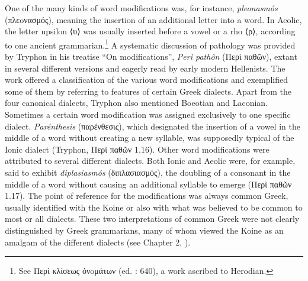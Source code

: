 One of the many kinds of word modifications was, for instance, \textit{pleonasmós} (πλεoνασμός), meaning the insertion of an additional letter into a word. In Aeolic, the letter upsilon ⟨υ⟩ was usually inserted before a vowel or a rho ⟨ρ⟩, according to one ancient grammarian.\footnote{{See Περὶ κλίσεως ὀνoμάτων (ed. \citealt{Lentz1870}: 640), a work ascribed to Herodian.}} A systematic discussion of pathology was provided by Tryphon in his treatise “On modifications”, \textit{Perì pathôn} (Περὶ παθῶν), extant in several different versions and eagerly read by early modern Hellenists. The work offered a classification of the various word modifications and exemplified some of them by referring to features of certain Greek dialects. Apart from the four canonical dialects, Tryphon also mentioned Boeotian and Laconian. Sometimes a certain word modification was assigned exclusively to one specific dialect. \textit{Parénthesis} (παρένθεσις), which designated the insertion of a vowel in the middle of a word without creating a new syllable, was supposedly typical of the Ionic dialect (Tryphon, Περὶ παθῶν 1.16). Other word modifications were attributed to several different dialects. Both Ionic and Aeolic were, for example, said to exhibit \textit{diplasiasmós} (διπλασιασμός), the doubling of a consonant in the middle of a word without causing an additional syllable to emerge (Περὶ παθῶν 1.17). The point of reference for the modifications was always common Greek, usually identified with the Koine or also with what was believed to be common to most or all dialects. These two interpretations of common Greek were not clearly distinguished by Greek grammarians, many of whom viewed the Koine as an amalgam of the different dialects (see Chapter 2, ).



